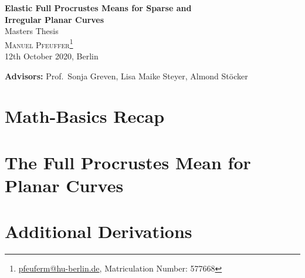 \documentclass[a4paper,12pt,pagesize,DIV=calc,smallheadings,english]{article}
\begin{document}
\begin{titlepage}

  \begin{center}
    {\LARGE\textbf{Elastic Full Procrustes Means for Sparse and\vspace{0.4cm}\\
    Irregular Planar Curves}}
  \vspace{1cm}\\
  {\large Masters Thesis}
  \vspace{0.7cm}\\
  \textsc{Manuel Pfeuffer\footnote{\url{pfeuferm@hu-berlin.de}, Matriculation Number: 577668}}
  \vspace{0.1cm}\\
  12th October 2020, Berlin
  \vspace{1cm}\\

  \vfill
  \end{center}

  \noindent \textbf{Advisors:} Prof.\ Sonja Greven, Lisa Maike Steyer, Almond Stöcker
  \vspace{0.5em}

\end{titlepage}


\tableofcontents
\newpage


\section{Math-Basics Recap}
\label{sec:intro}



\section{The Full Procrustes Mean for Planar Curves}
\label{sec:proc2d}



\appendix
\newpage
\section{Additional Derivations}
\label{app:deriv}



\newpage
\nocite{*}
\printbibliography[heading=bibintoc] %
\end{document}
